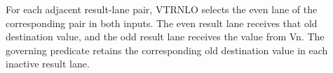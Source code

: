 For each adjacent result-lane pair, VTRNLO selects the even lane of the
corresponding pair in both inputs.  The even result lane receives that old
destination value, and the odd result lane receives the value from Vn.  The
governing predicate retains the corresponding old destination value in each
inactive result lane.
